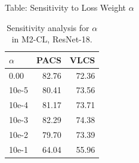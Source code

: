 \documentclass[t, aspectratio=169]{beamer} %
\begin{document}
	\begin{frame}{Table: Sensitivity to Loss Weight $\alpha$}
\begin{table}[htbp]
\centering
\caption{Sensitivity analysis for $\alpha$ in M2-CL, ResNet-18.}
\scriptsize
\begin{tabular}{lrr}
\toprule
$\alpha$ & PACS & VLCS \\
\midrule
0.00 & 82.76 & 72.36 \\
10e-5 & 80.41 & 73.56 \\
10e-4 & 81.17 & 73.71 \\
10e-3 & 82.29 & 74.38 \\
10e-2 & 79.70 & 73.39 \\
10e-1 & 64.04 & 55.96 \\
\bottomrule
\end{tabular}
\end{table}
	\end{frame}
\end{document}
